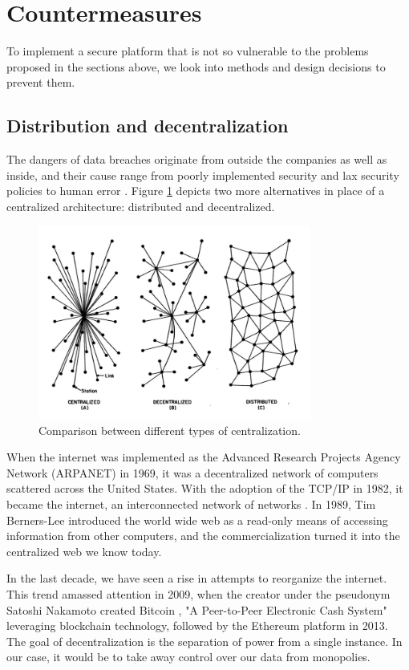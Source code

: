\section{Countermeasures}
To implement a secure platform that is not so vulnerable to the problems proposed in the sections above, we look into methods and design decisions to prevent them.
\subsection{Distribution and decentralization}
The dangers of data breaches originate from outside the companies as well as inside, and their cause range from poorly implemented security and lax security policies to human error \cite{riskbasedsecurity}.
Figure \ref{fig:comparison} depicts two more alternatives in place of a centralized architecture: distributed and decentralized.

\begin{figure}[htpb]
  \centering
  \includegraphics[width=0.8\textwidth]{figures/comparison.jpg}
  \caption{Comparison between different types of centralization.} \label{fig:comparison}
\end{figure}

When the internet was implemented as the Advanced Research Projects Agency Network (ARPANET) in 1969, it was a decentralized network of computers scattered across the United States. With the adoption of the TCP/IP in 1982, it became the internet, an interconnected network of networks \cite{DBLP:books/daglib/0006297}.
In 1989, Tim Berners-Lee introduced the world wide web as a read-only means of accessing information from other computers, and the commercialization turned it into the centralized web we know today. 

In the last decade, we have seen a rise in attempts to reorganize the internet. This trend amassed attention in 2009, when the creator under the pseudonym Satoshi Nakamoto created Bitcoin \cite{bitcoin}, "A Peer-to-Peer Electronic Cash System" leveraging blockchain technology, followed by the Ethereum \cite{ethereum} platform in 2013.
The goal of decentralization is the separation of power from a single instance. In our case, it would be to take away control over our data from monopolies. 

